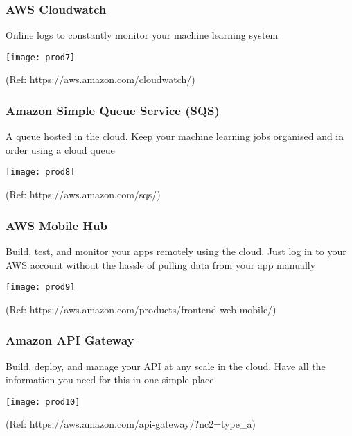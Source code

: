 \begin{frame}\frametitle{AWS Cloudwatch}
Online logs to constantly monitor your machine learning system

\begin{center}
\texttt{[image: prod7]}
\end{center}

{\tiny (Ref: https://aws.amazon.com/cloudwatch/)}
\end{frame}

\begin{frame}\frametitle{Amazon Simple Queue Service (SQS)}
A queue hosted in the cloud. Keep your machine learning jobs organised and in order using a cloud queue


\begin{center}
\texttt{[image: prod8]}
\end{center}

{\tiny (Ref: https://aws.amazon.com/sqs/)}
\end{frame}

\begin{frame}\frametitle{AWS Mobile Hub}
Build, test, and monitor your apps remotely using the cloud. Just log in to your AWS account without the hassle of pulling data from your app manually

\begin{center}
\texttt{[image: prod9]}
\end{center}

{\tiny (Ref: https://aws.amazon.com/products/frontend-web-mobile/)}
\end{frame}


\begin{frame}\frametitle{Amazon API Gateway}
Build, deploy, and manage your API at any scale in the cloud. Have all the information you need for this in one simple place

\begin{center}
\texttt{[image: prod10]}
\end{center}

{\tiny (Ref: https://aws.amazon.com/api-gateway/?nc2=type\_a)}


\end{frame}

